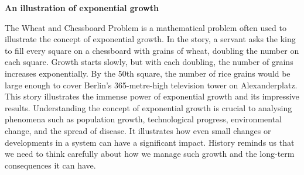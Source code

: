 \documentclass[
  letterpaper,
  DIV=11,
  numbers=noendperiod]{scrreprt}
\begin{document}
\begin{tcolorbox}[enhanced jigsaw, toprule=.15mm, breakable, opacityback=0, arc=.35mm, colback=white, rightrule=.15mm, bottomrule=.15mm, colframe=quarto-callout-tip-color-frame, left=2mm, leftrule=.75mm]

\vspace{-3mm}\textbf{An illustration of exponential growth}\vspace{3mm}

The Wheat and Chessboard Problem is a mathematical problem often used to
illustrate the concept of exponential growth. In the story, a servant
asks the king to fill every square on a chessboard with grains of wheat,
doubling the number on each square. Growth starts slowly, but with each
doubling, the number of grains increases exponentially. By the 50th
square, the number of rice grains would be large enough to cover
Berlin's 365-metre-high television tower on Alexanderplatz. This story
illustrates the immense power of exponential growth and its impressive
results. Understanding the concept of exponential growth is crucial to
analysing phenomena such as population growth, technological progress,
environmental change, and the spread of disease. It illustrates how even
small changes or developments in a system can have a significant impact.
History reminds us that we need to think carefully about how we manage
such growth and the long-term consequences it can have.

\end{tcolorbox}
\end{document}
